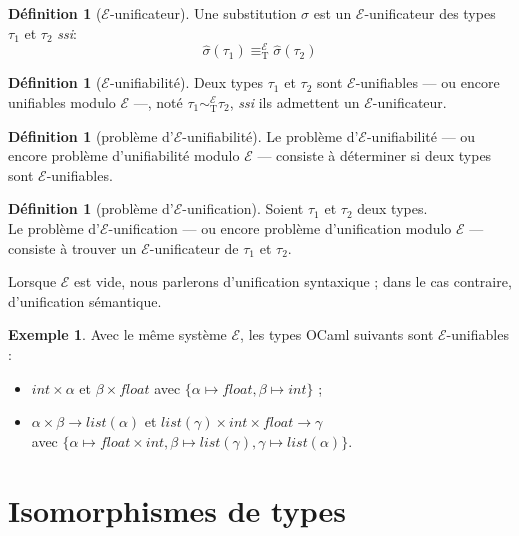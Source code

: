 \documentclass[a4paper]{report}
\theoremstyle{definition}
\newtheorem{definition}[theoreme]{Définition}
\newtheorem{exemple}[theoreme]{Exemple}
\newcommand{\ssi}{\textit{ssi}\xspace}
\newcommand{\E}{\mathscr{E}}
\newcommand{\T}{\mathrm{T}}
\begin{document}
\begin{definition}[$\E$-unificateur]
  Une substitution $\sigma$ est un $\E$-unificateur des types $\tau_1$ et $\tau_2$ \ssi :
  \[ \hat\sigma (\tau_1) \equiv_\T^\E \hat\sigma (\tau_2) \]
\end{definition}

\begin{definition}[$\E$-unifiabilité]
  Deux types $\tau_1$ et $\tau_2$ sont $\E$-unifiables — ou encore unifiables modulo $\E$ —, noté $\tau_1 \sim_\T^\E \tau_2$, \ssi ils admettent un $\E$-unificateur.
\end{definition}

\begin{definition}[problème d'$\E$-unifiabilité]
  Le problème d'$\E$-unifiabilité — ou encore problème d'unifiabilité modulo $\E$ — consiste à déterminer si deux types sont $\E$-unifiables.
\end{definition}

\begin{definition}[problème d'$\E$-unification]
  Soient $\tau_1$ et $\tau_2$ deux types. \\
  Le problème d'$\E$-unification — ou encore problème d'unification modulo $\E$ — consiste à trouver un $\E$-unificateur de $\tau_1$ et $\tau_2$.
\end{definition}

Lorsque $\E$ est vide, nous parlerons d'unification syntaxique ; dans le cas contraire, d'unification sémantique.

\begin{exemple}
  Avec le même système $\E$, les types OCaml suivants sont $\E$-unifiables :
  \begin{itemize}
    \item $int \times \alpha$ et $\beta \times float$ avec $\{ \alpha \mapsto float, \beta \mapsto int \}$ ;
    \item $\alpha \times \beta \rightarrow list (\alpha)$ et $list (\gamma) \times int \times float \rightarrow \gamma$ \\ avec $\{ \alpha \mapsto float \times int, \beta \mapsto list (\gamma), \gamma \mapsto list (\alpha) \}$.
  \end{itemize}
\end{exemple}


\section{Isomorphismes de types}
\end{document}

